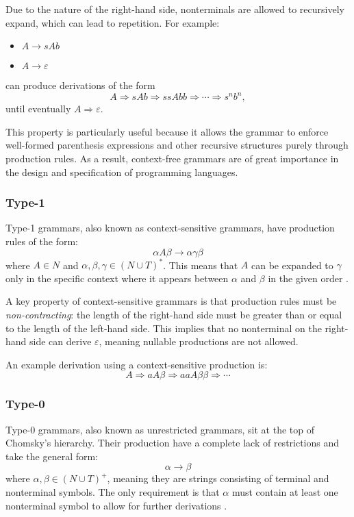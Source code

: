 Due to the nature of the right-hand side, nonterminals are allowed to recursively expand, which can lead to repetition. For example:
\begin{itemize}
    \item[] \( A \rightarrow sAb \)
    \item[] \( A \rightarrow \varepsilon \)
\end{itemize}
can produce derivations of the form
\[
A \Rightarrow sAb \Rightarrow ssAbb \Rightarrow \cdots \Rightarrow s^n b^n,
\]
until eventually \( A \Rightarrow \varepsilon \).

This property is particularly useful because it allows the grammar to enforce well-formed parenthesis expressions and other recursive structures purely through production rules. As a result, context-free grammars are of great importance in the design and specification of programming languages\cite{hendriksConsiderItParsed,shiIntelligenceScience2021}.

\subsubsection{Type-1}

Type-1 grammars, also known as context-sensitive grammars, have production rules of the form:
\[
\alpha A \beta \rightarrow \alpha \gamma \beta
\]
where \( A \in N \) and \( \alpha, \beta, \gamma \in (N \cup T)^* \). This means that \( A \) can be expanded to \( \gamma \) only in the specific context where it appears between \( \alpha \) and \( \beta \) in the given order \cite{hendriksConsiderItParsed,shiIntelligenceScience2021}.

\vspace{\baselineskip}
A key property of context-sensitive grammars is that production rules must be \emph{non-contracting}: the length of the right-hand side must be greater than or equal to the length of the left-hand side. This implies that no nonterminal on the right-hand side can derive \( \varepsilon \), meaning nullable productions are not allowed.

An example derivation using a context-sensitive production is:
\[
A \Rightarrow aA\beta \Rightarrow aaA\beta\beta \Rightarrow \cdots
\]

\subsubsection{Type-0}

Type-0 grammars, also known as unrestricted grammars, sit at the top of Chomsky's hierarchy. Their production have a complete lack of restrictions and take the general form:
\[
\alpha \rightarrow \beta
\]
where \( \alpha, \beta \in (N \cup T)^+ \), meaning they are strings consisting of terminal and nonterminal symbols. The only requirement is that \( \alpha \) must contain at least one nonterminal symbol to allow for further derivations \cite{hendriksConsiderItParsed,shiIntelligenceScience2021}.

